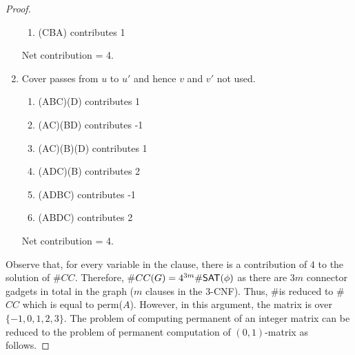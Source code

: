 \documentclass[11pt]{article}
\newcommand{\perm}{{\sf perm}}
\begin{document}
\begin{proof}
\begin{enumerate}
\begin{enumerate}
                    \item (CBA) contributes 1
                \end{enumerate}
                Net contribution = 4.
            \item
                Cover passes from $u$ to $u'$ and hence $v$ and $v'$ not used.           \begin{enumerate}
                    \item (ABC)(D) contributes 1 
                    \item (AC)(BD) contributes -1 
                    \item (AC)(B)(D) contributes 1 
                    \item (ADC)(B) contributes 2 
                    \item (ADBC) contributes -1 
                    \item (ABDC) contributes 2 
                \end{enumerate}
                Net contribution = 4.
        \end{enumerate}
        Observe that, for every variable in the clause, there is a contribution of $4$ to the solution of \#$CC$. Therefore, \#$CC(G) = 4^{3m}\#{\mathsf{SAT}}(\phi)$ as there are $3m$ connector gadgets in total in the graph ($m$ clauses in the 3-CNF). Thus, \#\SAT is reduced to \#$CC$ which is equal to \perm($A$). However, in this argument, the matrix is over $\{-1, 0, 1, 2, 3\}$. The problem of computing permanent of an integer matrix can be reduced to the problem of permanent computation of $(0,1)$-matrix as follows. %
        

\end{proof}
\end{document}
